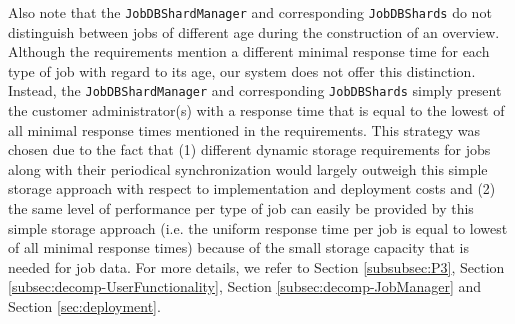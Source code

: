 \documentclass[a4paper,10pt]{article}
\begin{document}
Also note that the \texttt{JobDBShardManager} and corresponding \texttt{JobDBShards} do not distinguish between jobs of different age during the construction of an overview. Although the requirements mention a different minimal response time for each type of job with regard to its age, our system does not offer this distinction. Instead, the \texttt{JobDBShardManager} and corresponding \texttt{JobDBShards} simply present the customer administrator(s) with a response time that is equal to the lowest of all minimal response times mentioned in the requirements. This strategy was chosen due to the fact that (1) different dynamic storage requirements for jobs along with their periodical synchronization would largely outweigh this simple storage approach with respect to implementation and deployment costs and (2) the same level of performance per type of job can easily be provided by this simple storage approach (i.e. the uniform response time per job is equal to lowest of all minimal response times) because of the small storage capacity that is needed for job data.
For more details, we refer to Section \ref{subsubsec:P3}, Section \ref{subsec:decomp-UserFunctionality}, Section \ref{subsec:decomp-JobManager} and Section \ref{sec:deployment}.
\end{document}
